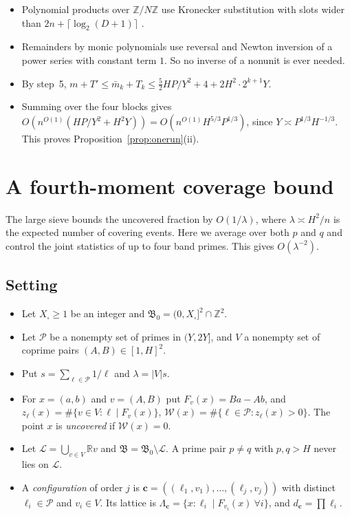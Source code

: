 \documentclass[11pt]{amsart}
\theoremstyle{definition}
\newcommand{\Z}{\mathbb{Z}}
\newcommand{\R}{\mathbb{R}}
\newcommand{\mbar}{\bar m_k}
\newcommand{\Xb}{X_{\square}}
\begin{document}
\begin{itemize}
\item Polynomial products over $\Z/N\Z$ use Kronecker substitution with slots wider than
  $2n+\lceil\log_2(D+1)\rceil$ \cite{vzgg}.
\item Remainders by monic polynomials use reversal and Newton inversion of a power series with
  constant term $1$. So no inverse of a nonunit is ever needed.
\item By step~5, $m+T'\le\mbar+T_k\le\tfrac52HP/Y^2+4+2H^2\cdot2^{k+1}Y$.
\item Summing over the four blocks gives $O(n^{O(1)}(HP/Y^2+H^2Y))=O(n^{O(1)}H^{5/3}P^{1/3})$,
  since $Y\asymp P^{1/3}H^{-1/3}$. This proves Proposition~\ref{prop:onerun}(ii).
\end{itemize}

\section{A fourth-moment coverage bound}\label{sec:fourth}

The large sieve bounds the uncovered fraction by $O(1/\lambda)$, where $\lambda\asymp H^2/n$ is
the expected number of covering events. Here we average over both $p$ and $q$ and control the
joint statistics of up to four band primes. This gives $O(\lambda^{-2})$.

\subsection{Setting}
\begin{itemize}
\item Let $\Xb\ge1$ be an integer and $\mathfrak B_0=(0,\Xb]^2\cap\Z^2$.
\item Let $\mathcal P$ be a nonempty set of primes in $(Y,2Y]$, and $V$ a nonempty set of
  coprime pairs $(A,B)\in[1,H]^2$.
\item Put $s=\sum_{\ell\in\mathcal P}1/\ell$ and $\lambda=|V|s$.
\item For $x=(a,b)$ and $v=(A,B)$ put $F_v(x)=Ba-Ab$, and
  $z_\ell(x)=\#\{v\in V:\ell\mid F_v(x)\}$, $\mathcal W(x)=\#\{\ell\in\mathcal P:z_\ell(x)>0\}$.
  The point $x$ is \emph{uncovered} if $\mathcal W(x)=0$.
\item Let $\mathcal L=\bigcup_{v\in V}\R v$ and $\mathfrak B=\mathfrak B_0\setminus\mathcal L$.
  A prime pair $p\ne q$ with $p,q>H$ never lies on $\mathcal L$.
\item A \emph{configuration} of order $j$ is $\mathbf c=((\ell_1,v_1),\dots,(\ell_j,v_j))$ with
  distinct $\ell_i\in\mathcal P$ and $v_i\in V$. Its lattice is
  $\Lambda_{\mathbf c}=\{x:\ell_i\mid F_{v_i}(x)\ \forall i\}$, and
  $d_{\mathbf c}=\prod\ell_i$.
\end{itemize}
\end{document}
